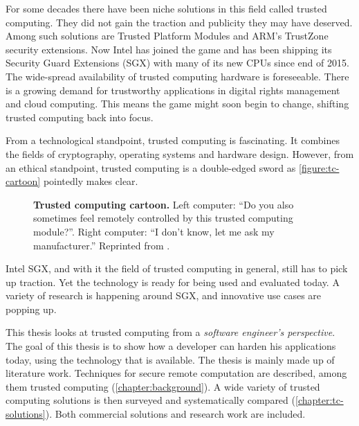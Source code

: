For some decades there have been niche solutions in this field called trusted computing. They did not gain the traction and publicity they may have deserved. Among such solutions are Trusted Platform Modules and ARM's TrustZone security extensions.\label{ID_853445864}
Now Intel has joined the game and has been shipping its Security Guard Extensions (SGX) with many of its new CPUs since end of 2015.\label{ID_563845396}
The wide-spread availability of trusted computing hardware is foreseeable. There is a growing demand for trustworthy applications in digital rights management and cloud computing. This means the game might soon begin to change, shifting trusted computing back into focus.\label{ID_1881143424}

From a technological standpoint, trusted computing is fascinating. It combines the fields of cryptography, operating systems and hardware design.\label{ID_1778003077}
However, from an ethical standpoint, trusted computing is a double-edged sword as \autoref{figure:tc-cartoon} pointedly makes clear.\label{ID_1885832293}
\begin{figure}[htbp]
\caption{\textbf{Trusted computing cartoon.} Left computer: ``Do you also sometimes feel remotely controlled by this trusted computing module?''. Right computer: ``I don't know, let me ask my manufacturer.'' Reprinted from \cite{ix-enclave}.\label{ID_863606381}\label{figure:tc-cartoon}\label{ID_863606381}\label{figure:tc-cartoon}}
\end{figure}


Intel SGX, and with it the field of trusted computing in general, still has to pick up traction. Yet the technology is ready for being used and evaluated today.\label{ID_1141283910}
A variety of research is happening around SGX, and innovative use cases are popping up.\label{ID_970909799}

This thesis looks at trusted computing from a \textit{software engineer's perspective}.\label{ID_889066539}
The goal of this thesis is to show how a developer can harden his applications today, using the technology that is available.\label{ID_128655856}
The thesis is mainly made up of literature work.\label{ID_941979765}
Techniques for secure remote computation are described, among them trusted computing (\autoref{chapter:background}).\label{ID_1961860825}
A wide variety of trusted computing solutions is then surveyed and systematically compared (\autoref{chapter:tc-solutions}). Both commercial solutions and research work are included.\label{ID_1378520845}

